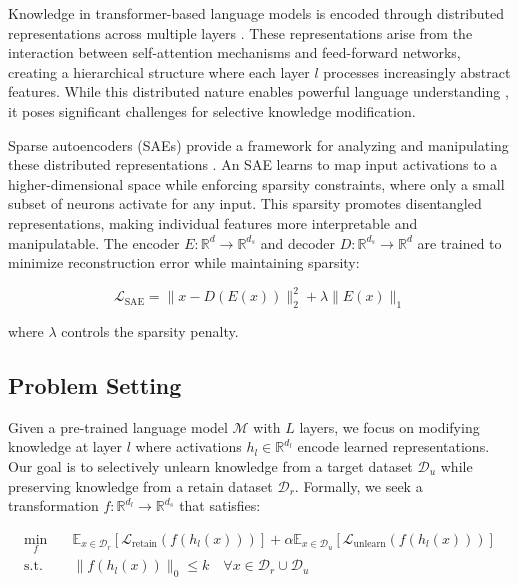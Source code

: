 \documentclass{article} %
\begin{document}
Knowledge in transformer-based language models is encoded through distributed representations across multiple layers \cite{vaswani2017attention}. These representations arise from the interaction between self-attention mechanisms and feed-forward networks, creating a hierarchical structure where each layer $l$ processes increasingly abstract features. While this distributed nature enables powerful language understanding \cite{radford2019language}, it poses significant challenges for selective knowledge modification.

Sparse autoencoders (SAEs) provide a framework for analyzing and manipulating these distributed representations \cite{goodfellow2016deep}. An SAE learns to map input activations to a higher-dimensional space while enforcing sparsity constraints, where only a small subset of neurons activate for any input. This sparsity promotes disentangled representations, making individual features more interpretable and manipulatable. The encoder $E: \mathbb{R}^d \rightarrow \mathbb{R}^{d_s}$ and decoder $D: \mathbb{R}^{d_s} \rightarrow \mathbb{R}^d$ are trained to minimize reconstruction error while maintaining sparsity:

\begin{equation}
\mathcal{L}_{\text{SAE}} = \|x - D(E(x))\|_2^2 + \lambda\|E(x)\|_1
\end{equation}

where $\lambda$ controls the sparsity penalty.

\subsection{Problem Setting}
Given a pre-trained language model $\mathcal{M}$ with $L$ layers, we focus on modifying knowledge at layer $l$ where activations $h_l \in \mathbb{R}^{d_l}$ encode learned representations. Our goal is to selectively unlearn knowledge from a target dataset $\mathcal{D}_u$ while preserving knowledge from a retain dataset $\mathcal{D}_r$. Formally, we seek a transformation $f: \mathbb{R}^{d_l} \rightarrow \mathbb{R}^{d_s}$ that satisfies:

\begin{align}
\min_{f} \quad & \mathbb{E}_{x \in \mathcal{D}_r}[\mathcal{L}_{\text{retain}}(f(h_l(x)))] + \alpha\mathbb{E}_{x \in \mathcal{D}_u}[\mathcal{L}_{\text{unlearn}}(f(h_l(x)))] \\
\text{s.t.} \quad & \|f(h_l(x))\|_0 \leq k \quad \forall x \in \mathcal{D}_r \cup \mathcal{D}_u
\end{align}
\end{document}
